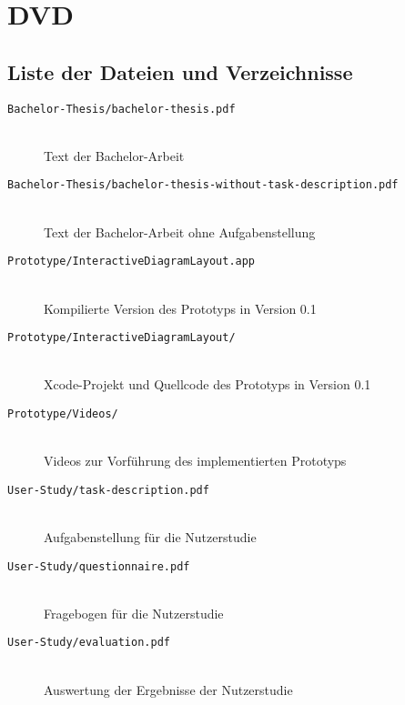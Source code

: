 
\chapter{DVD}
\label{chapter:dvd}

\section{Liste der Dateien und Verzeichnisse}

\begin{description}
    \item[\texttt{Bachelor-Thesis/bachelor-thesis.pdf}] 
        \hfill \\ Text der Bachelor-Arbeit
    \item[\texttt{Bachelor-Thesis/bachelor-thesis-without-task-description.pdf}] 
        \hfill \\ Text der Bachelor-Arbeit ohne Aufgabenstellung
    \item[\texttt{Prototype/InteractiveDiagramLayout.app}]
        \hfill \\ Kompilierte Version des Prototyps in Version 0.1
    \item[\texttt{Prototype/InteractiveDiagramLayout/}] 
        \hfill \\ Xcode-Projekt und 
Quellcode des Prototyps in Version 0.1
    \item[\texttt{Prototype/Videos/}] 
        \hfill \\ Videos zur Vorführung des implementierten Prototyps
    \item[\texttt{User-Study/task-description.pdf}] 
        \hfill \\ Aufgabenstellung für die Nutzerstudie
    \item[\texttt{User-Study/questionnaire.pdf}]
        \hfill \\ Fragebogen für die Nutzerstudie
    \item[\texttt{User-Study/evaluation.pdf}]
        \hfill \\ Auswertung der Ergebnisse der Nutzerstudie
\end{description}
